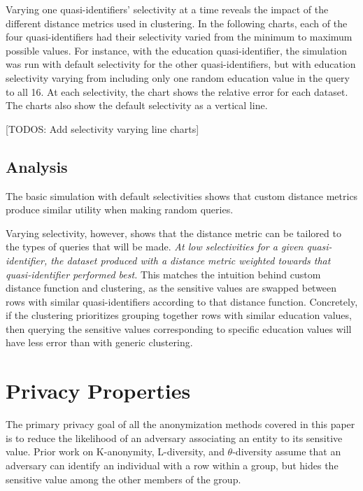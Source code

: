 Varying one quasi-identifiers' selectivity at a time reveals the impact of the different distance metrics used in clustering. In the following charts, each of the four quasi-identifiers had their selectivity varied from the minimum to maximum possible values. For instance, with the education quasi-identifier, the simulation was run with default selectivity for the other quasi-identifiers, but with education selectivity varying from including only one random education value in the query to all 16. At each selectivity, the chart shows the relative error for each dataset. The charts also show the default selectivity as a vertical line.

[TODOS: Add selectivity varying line charts]

\subsection{Analysis}

The basic simulation with default selectivities shows that custom distance metrics produce similar utility when making random queries.

Varying selectivity, however, shows that the distance metric can be tailored to the types of queries that will be made. \emph{At low selectivities for a given quasi-identifier, the dataset produced with a distance metric weighted towards that quasi-identifier performed best.} This matches the intuition behind custom distance function and clustering, as the sensitive values are swapped between rows with similar quasi-identifiers according to that distance function. Concretely, if the clustering prioritizes grouping together rows with similar education values, then querying the sensitive values corresponding to specific education values will have less error than with generic clustering.

\section{Privacy Properties}
The primary privacy goal of all the anonymization methods covered in this paper is to reduce the likelihood of an adversary associating an  entity to its sensitive value. Prior work on K-anonymity, L-diversity, and $\theta$-diversity assume that an adversary can identify an individual with a row within a group, but hides the sensitive value among the other members of the group.

